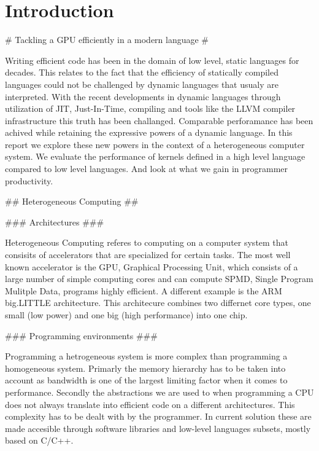 
\chapter{Introduction}





\begin{markdown}
# Tackling a GPU efficiently in a modern language #

Writing efficient code has been in the domain of low level, static
languages for decades. This relates to the fact that the efficiency of
statically compiled languages could not be challenged by dynamic
languages that usualy are interpreted.  With the recent developments
in dynamic languages through utilization of JIT, Just-In-Time,
compiling and tools like the LLVM compiler infrastructure this truth
has been challanged. Comparable perforamance has been achived while
retaining the expressive powers of a dynamic language. In this report
we explore these new powers in the context of a heterogeneous computer
system. We evaluate the performance of kernels defined in a high level
language compared to low level languages. And look at what we gain in
programmer productivity.

## Heterogeneous Computing ##

### Architectures ###

Heterogeneous Computing referes to computing on a computer system that
consisits of accelerators that are specialized for certain tasks. The
most well known accelerator is the GPU, Graphical Processing Unit,
which consists of a large number of simple computing cores and can
compute SPMD, Single Program Mulitple Data, programs highly
efficient. A different example is the ARM big.LITTLE \cite{big.little}
architecture. This architecure combines two differnet core types, one
small (low power) and one big (high performance) into one chip.

### Programming environments ###

Programming a hetrogeneous system is more complex than programming a
homogeneous system. Primarly the memory hierarchy has to be taken into
account as bandwidth is one of the largest limiting factor when it
comes to performance. Secondly the abstractions we are used to when
programming a CPU does not always translate into efficient code on a
different architectures. This complexity has to be dealt with by the
programmer. In current solution these are made accesible through
software libraries and low-level languages subsets, mostly based on
C/C++.


\end{markdown}
